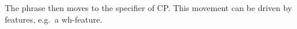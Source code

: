 \documentclass[crop]{standalone}
\begin{document}
The phrase then moves to the specifier of CP\@.
This movement can be driven by features, e.g.~a wh-feature.
\end{document}
